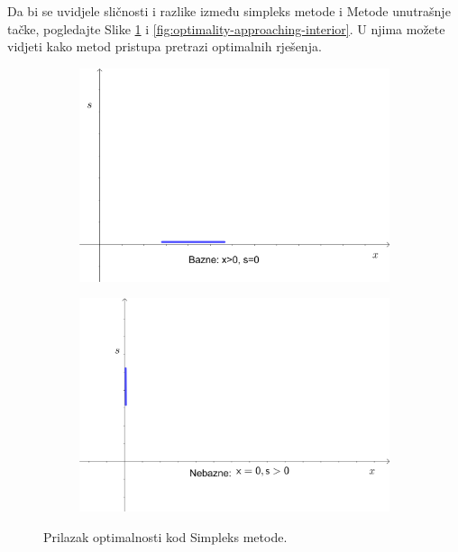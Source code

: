 \documentclass[a4paper, utf8, 11pt, colorlinks]{book}
\begin{document}
Da bi se uvidjele sličnosti i razlike između simpleks metode i Metode unutrašnje tačke, pogledajte Slike \ref{fig:optimality-approaching-simplex} i  \ref{fig:optimality-approaching-interior}. U njima možete vidjeti kako metod pristupa pretrazi optimalnih rješenja. 

\begin{figure}
	 	\begin{subfigure}{.45\textwidth}
	 	\centering
	 	\includegraphics[width=.9\linewidth]{interior-1}  
	 \end{subfigure}
 	 	\begin{subfigure}{.45\textwidth}
 	\centering
 	\includegraphics[width=.9\linewidth]{interior-2}  
 \end{subfigure}
  \caption{Prilazak optimalnosti kod Simpleks metode.}
   \label{fig:optimality-approaching-simplex}
\end{figure}
\end{document}
